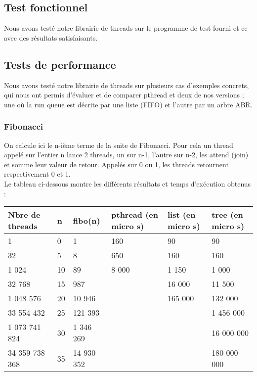 \subsection{Test fonctionnel}

Nous avons testé notre librairie de threads sur le programme de test fourni et ce avec des résultats satisfaisants.

\subsection{Tests de performance}

Nous avons testé notre librairie de threads sur plusieurs cas d'exemples concrets, qui nous ont permis d'évaluer et de comparer pthread et deux de nos versions ; une où la run queue est décrite par une liste (FIFO) et l'autre par un arbre ABR.
\subsubsection{Fibonacci}

On calcule ici le n-ième terme de la suite de Fibonacci. Pour cela un thread appelé sur l'entier n lance 2 threads, un sur n-1, l'autre sur n-2, les attend (join) et somme leur valeur de retour. Appelés sur 0 ou 1, les threads retournent respectivement 0 et 1.\\

Le tableau ci-dessous montre les différents résultats et temps d'exécution obtenus : \\
\begin{tabular}{|l|l|l|l|l|l|}
  \hline
  Nbre de threads & n & fibo(n)  & pthread (en micro s) & list (en micro s) & tree (en micro s)\\
  \hline
  1              & 0  & 1          &  160   & 90      & 90           \\
  32             & 5  & 8          &  650   & 160     & 160          \\
  1 024          & 10 & 89         &  8 000 & 1 150   & 1 000        \\
  32 768         & 15 & 987        &        & 16 000  & 11 500       \\
  1 048 576      & 20 & 10 946     &        & 165 000 & 132 000      \\
  33 554 432     & 25 & 121 393    &        &         & 1 456 000    \\
  1 073 741 824  & 30 & 1 346 269  &        &         & 16 000 000   \\
  34 359 738 368 & 35 & 14 930 352 &        &         & 180 000 000  \\
\hline
\end{tabular}


